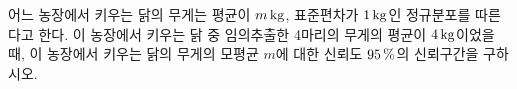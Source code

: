 어느 농장에서 키우는 닭의 무게는 평균이 $m\mkern3mu \mathrm{kg}$, 표준편차가 $1\mkern3mu \mathrm{kg}$인 정규분포를 따른다고 한다. 이 농장에서 키우는 닭 중 임의추출한 4마리의 무게의 평균이 $4\mkern3mu \mathrm{kg}$이었을 때, 이 농장에서 키우는 닭의 무게의 모평균 $m$에 대한 신뢰도 $95\mkern3mu \%$의 신뢰구간을 구하시오. 

